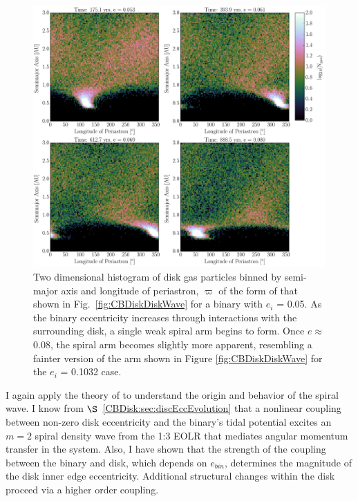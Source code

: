 \begin{figure}
	\includegraphics[width=\textwidth]{f6.pdf} %
    \caption{Two dimensional histogram of disk gas particles binned by semi-major axis and
longitude of periastron, $\varpi$ of the form of that shown in Fig.~\ref{fig:CBDiskDiskWave} for a binary with $e_i$ = 0.05.  As the binary eccentricity increases through 
interactions with the surrounding disk, a single weak spiral arm begins to form.  Once $e \approx$ 0.08, the spiral arm becomes slightly more apparent, 
resembling a fainter version of the arm shown in Figure \ref{fig:CBDiskDiskWave} for the $e_i$ = 0.1032 case.}
    \label{fig:CBDiskStruct}
\end{figure}

I again apply the theory of \citet{Papaloizou2001} to understand the origin and behavior of the spiral wave.  I know from $\S$~\ref{CBDisk:sec:discEccEvolution} that a nonlinear coupling between non-zero disk eccentricity and the binary's tidal potential excites an $m = 2$ spiral density wave from the 1:3 EOLR that mediates angular momentum transfer in the system.  Also, I have shown that the strength of the coupling between the binary and disk, which depends on $e_{bin}$, determines the magnitude of the disk inner edge eccentricity.  Additional structural changes within the disk proceed via a higher order coupling.  

